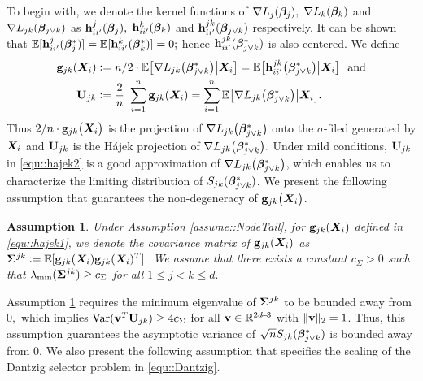 \documentclass[twoside,11pt]{article}
\newtheorem{assumption}[theorem]{Assumption}
\newcommand{\defeq}{\vcentcolon=}
\newcommand*{\BR}{\mathbb{R}}
\newcommand*{\bbetas}{\bbeta^*}
\newcommand*{\gradstarst} {\nabla L_{jk}\bigl(\bbeta_{j\vee k}^*\bigr)}
\begin{document}
  To begin with, we denote the kernel functions of $\nabla L_j(\bm{\beta}_j),$ $\nabla L_k (\bm{\beta}_k)$ and $\nabla L_{jk} (\bm{\beta}_{j \vee k} )$ as $\mathbf{h}_{ii'}^{j}(\bm{\beta}_j),$ $\mathbf{h}_{ii'}^k(\bm{\beta}_k)$ and $\mathbf{h}_{ii'}^{jk} (\bm{\beta}_{j\vee k} )$ respectively. It can be shown that $\EE  [\hb_{ii'}^j(\bbetas_j) ]= \EE  [ \hb_{ii'}^k(\bbetas_k)  ] =0; $ hence $\hb_{ii'}^{jk} (\bbetas_{j\vee k} )$ is also centered. We define
\begin{align}
\gb_{jk}(\bX_{i}) &\defeq n/2\cdot \EE \bigl [ \gradstarst \big | \bX_i \bigr] = \EE \bigl[\hb_{ii'}^{jk}\bigl(\bbetas_{j\vee k} \bigr)\big | \bX_i \bigr]~~\text{and}\label{equ::hajek1}\\
 \Ub_{jk} & \defeq \frac{2}{n} \ \sum_{i=1}^n \gb_{jk}( \bX_i) = \sum\limits_{i=1}^n\EE \bigl [ \gradstarst \big| \bX_i \bigr ].\label{equ::hajek2}
\end{align}
Thus $2/n \cdot\mathbf{g}_{jk}\bigl(\bm{X}_{i}\bigr)$ is the projection of $\gradstarst$ onto the $\sigma$-filed generated by $\bm{X}_i$ and $\mathbf{U}_{jk}$ is the H\'ajek projection of $\gradstarst.$
Under mild conditions, $\mathbf{U}_{jk}$ in \eqref{equ::hajek2} is a good approximation of $\gradstarst$, which enables us to characterize the limiting distribution of $S_{jk}(\bbetas_{j\vee k})$.
We present the following  assumption that guarantees the non-degeneracy of  $\mathbf{g}_{jk}\bigl(\bm{X}_{i}\bigr)$.
\begin{assumption} \label{assume::BoundedHess}
 Under Assumption \ref{assume::NodeTail}, for $\mathbf{g}_{jk}(\bm{X}_i)$ defined in \eqref{equ::hajek1}, we denote  the covariance matrix of $\mathbf{g}_{jk}(\bm{X}_i)$ as  $\bSigma^{jk} \defeq \EE  [ \gb_{jk}(\bX_{i})\gb_{jk}(\bX_i )^T  ].$  We assume that   there exists a  constant $c_\Sigma>0$   such that $\lambda_{\min}(\bm{\Sigma}^{jk}) \geq c_\Sigma$ for all $1\!\leq\! j\!<\!k\!\leq\! d.$
\end{assumption}
Assumption \ref{assume::BoundedHess} requires the minimum eigenvalue of $\bm{\Sigma} ^{jk}$ to be bounded away from $0, $ which implies   $\text{Var}(\mathbf{v}^T \mathbf{U}_{jk} )\geq 4 c_{\Sigma}$ for   all $\vb\in \BR^{2d\!-\!3}$ with $\|\mathbf{v}\|_2 = 1$.  Thus, this assumption guarantees the asymptotic variance of $\sqrt{n} S_{jk}(\bbetas_{j\vee k})$ is bounded away from $0$. 
We also present the following assumption that specifies the scaling of the Dantzig selector problem in \eqref{equ::Dantzig}.
\end{document}
